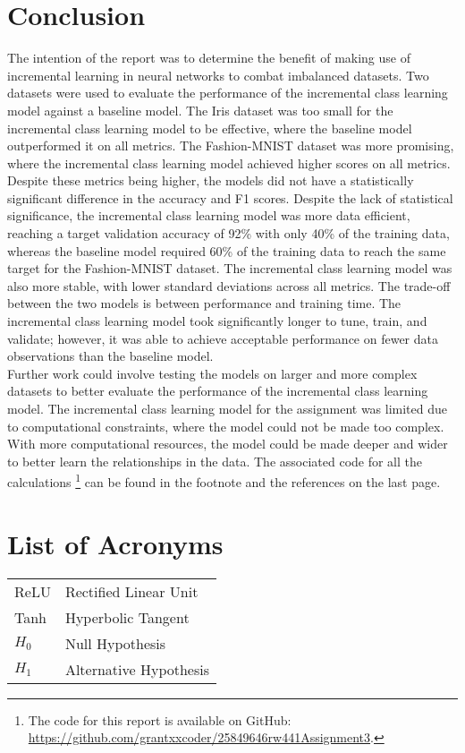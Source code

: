 \documentclass[conference]{IEEEtran}
\begin{document}
\section{Conclusion}
The intention of the report was to determine the benefit of making use of incremental learning in neural networks to combat imbalanced datasets. Two datasets were used to evaluate the performance of the incremental class learning model against a baseline model. The Iris dataset was too small for the incremental class learning model to be effective, where the baseline model outperformed it on all metrics. 
The Fashion-MNIST dataset was more promising, where the incremental class learning model achieved higher scores on all metrics. Despite these metrics being higher, the models 
did not have a statistically significant difference in the accuracy and F1 scores. Despite the lack of statistical significance, the incremental class learning model was more data efficient, reaching a 
target validation accuracy of 92\% with only 40\% of the training data, whereas the baseline model required 60\% of the training data
 to reach the same target for the Fashion-MNIST dataset. The incremental class learning model was also more stable, with lower 
 standard deviations across all metrics. The trade-off between the two models is between performance and training time. The
 incremental class learning model took significantly longer to tune, train, and validate; however, it was able to achieve
 acceptable performance on fewer data observations than the baseline model. \\

 Further work could involve testing the models on larger and more complex datasets to better evaluate the performance of the incremental class learning model. The incremental class 
 learning model for the assignment was limited due to computational constraints, where the model could not be made too complex. With more computational resources, the model could be made deeper and wider to better learn the relationships in the data.
 The associated code for all the calculations
\footnote{The code for this report is available on GitHub: \url{https://github.com/grantxxcoder/25849646rw441Assignment3}.} can be found in the footnote and the references on the last page.
\appendix

\section*{List of Acronyms}
\begingroup
\setlength{\tabcolsep}{6pt}
\renewcommand{\arraystretch}{1.05}
\noindent\begin{tabular}{@{}p{}p{}@{}}
ReLU & Rectified Linear Unit \\
Tanh & Hyperbolic Tangent \\
$H_0$ & Null Hypothesis \\
$H_1$ & Alternative Hypothesis 
\end{tabular}
\endgroup



\end{document}
